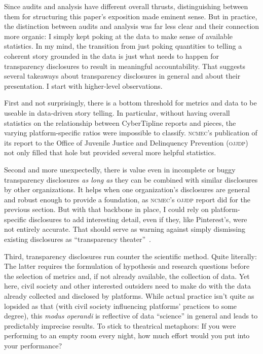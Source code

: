 \documentclass[nonacm,screen]{acmart}
\newcommand\V[1]{\textsc{\MakeLowercase{#1}}}
\begin{document}
Since audits and analysis have different overall thrusts, distinguishing between
them for structuring this paper's exposition made eminent sense. But in
practice, the distinction between audits and analysis was far less clear and
their connection more organic: I simply kept poking at the data to make sense of
available statistics. In my mind, the transition from just poking quantities to
telling a coherent story grounded in the data is just what needs to happen for
transparency disclosures to result in meaningful accountability. That suggests
several takeaways about transparency disclosures in general and about their
presentation. I start with higher-level observations.

First and not surprisingly, there is a bottom threshold for metrics and data to
be useable in data-driven story telling. In particular, without having overall
statistics on the relationship between CyberTipline reports and pieces, the
varying platform-specific ratios were impossible to classify. \V{NCMEC}'s
publication of its report to the Office of Juvenile Justice and Delinquency
Prevention (\V{OJJDP}) not only filled that hole but provided several more
helpful statistics.

Second and more unexpectedly, there is value even in incomplete or buggy
transparency disclosures \emph{as long as} they can be combined with similar
disclosures by other organizations. It helps when one organization's disclosures
are general and robust enough to provide a foundation, as \V{NCMEC}'s \V{OJJDP}
report did for the previous section. But with that backbone in place, I could
rely on platform-specific disclosures to add interesting detail, even if they,
like Pinterest's, were not entirely accurate. That should serve as warning
against simply dismissing existing disclosures as ``transparency
theater''~\cite{Douek2022}.

Third, transparency disclosures run counter the scientific method. Quite
literally: The latter requires the formulation of hypothesis and research
questions before the selection of metrics and, if not already available, the
collection of data. Yet here, civil society and other interested outsiders need
to make do with the data already collected and disclosed by platforms. While
actual practice isn't quite as lopsided as that (with civil society influencing
platforms' practices to some degree), this \emph{modus operandi} is reflective
of data ``science'' in general and leads to predictably imprecise results. To
stick to theatrical metaphors: If you were performing to an empty room every
night, how much effort would you put into your performance?
\end{document}

